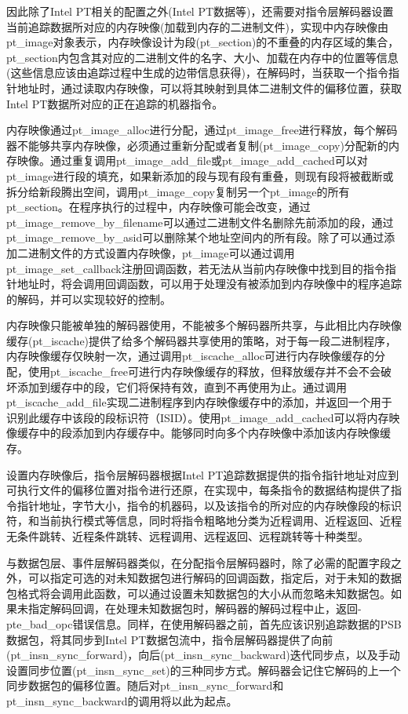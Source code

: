 因此除了Intel PT相关的配置之外(Intel PT数据等)，还需要对指令层解码器设置当前追踪数据所对应的内存映像(加载到内存的二进制文件)，实现中内存映像由pt\_image对象表示，内存映像设计为段(pt\_section)的不重叠的内存区域的集合，pt\_section内包含其对应的二进制文件的名字、大小、加载在内存中的位置等信息(这些信息应该由追踪过程中生成的边带信息获得)，在解码时，当获取一个指令指针地址时，通过读取内存映像，可以将其映射到具体二进制文件的偏移位置，获取Intel PT数据所对应的正在追踪的机器指令。

内存映像通过pt\_image\_alloc进行分配，通过pt\_image\_free进行释放，每个解码器不能够共享内存映像，必须通过重新分配或者复制(pt\_image\_copy)分配新的内存映像。通过重复调用pt\_image\_add\_file或pt\_image\_add\_cached可以对pt\_image进行段的填充，如果新添加的段与现有段有重叠，则现有段将被截断或拆分给新段腾出空间，调用pt\_image\_copy复制另一个pt\_image的所有pt\_section。在程序执行的过程中，内存映像可能会改变，通过pt\_image\_remove\_by\_filename可以通过二进制文件名删除先前添加的段，通过pt\_image\_remove\_by\_asid可以删除某个地址空间内的所有段。除了可以通过添加二进制文件的方式设置内存映像，pt\_image可以通过调用pt\_image\_set\_callback注册回调函数，若无法从当前内存映像中找到目的指令指针地址时，将会调用回调函数，可以用于处理没有被添加到内存映像中的程序追踪的解码，并可以实现较好的控制。

内存映像只能被单独的解码器使用，不能被多个解码器所共享，与此相比内存映像缓存(pt\_iscache)提供了给多个解码器共享使用的策略，对于每一段二进制程序，内存映像缓存仅映射一次，通过调用pt\_iscache\_alloc可进行内存映像缓存的分配，使用pt\_iscache\_free可进行内存映像缓存的释放，但释放缓存并不会不会破坏添加到缓存中的段，它们将保持有效，直到不再使用为止。通过调用pt\_iscache\_add\_file实现二进制程序到内存映像缓存中的添加，并返回一个用于识别此缓存中该段的段标识符（ISID）。使用pt\_image\_add\_cached可以将内存映像缓存中的段添加到内存缓存中。能够同时向多个内存映像中添加该内存映像缓存。

设置内存映像后，指令层解码器根据Intel PT追踪数据提供的指令指针地址对应到可执行文件的偏移位置对指令进行还原，在实现中，每条指令的数据结构提供了指令指针地址，字节大小，指令的机器码，以及该指令的所对应的内存映像段的标识符，和当前执行模式等信息，同时将指令粗略地分类为近程调用、近程返回、近程无条件跳转、近程条件跳转、远程调用、远程返回、远程跳转等十种类型。

与数据包层、事件层解码器类似，在分配指令层解码器时，除了必需的配置字段之外，可以指定可选的对未知数据包进行解码的回调函数，指定后，对于未知的数据包格式将会调用此函数，可以通过设置未知数据包的大小从而忽略未知数据包。如果未指定解码回调，在处理未知数据包时，解码器的解码过程中止，返回-pte\_bad\_opc错误信息。同样，在使用解码器之前，首先应该识别追踪数据的PSB数据包，将其同步到Intel PT数据包流中，指令层解码器提供了向前(pt\_insn\_sync\_forward)，向后(pt\_insn\_sync\_backward)迭代同步点，以及手动设置同步位置(pt\_insn\_sync\_set)的三种同步方式。解码器会记住它解码的上一个同步数据包的偏移位置。随后对pt\_insn\_sync\_forward和pt\_insn\_sync\_backward的调用将以此为起点。

